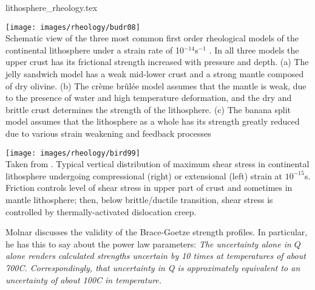 \begin{flushright} {\tiny {\color{gray} lithosphere\_rheology.tex}} \end{flushright}




\begin{center}
\texttt{[image: images/rheology/budr08]}\\
{\captionfont Schematic view of the three most common first order rheological models of the continental 
lithosphere under a strain rate of 10$^{-14}$s$^{-1}$ . 
In all three models the upper crust has its frictional strength increased with pressure and depth. 
(a) The jelly sandwich model has a weak mid-lower crust and a strong mantle composed of dry olivine. 
(b) The cr\`eme br\^ul\'ee model assumes that the mantle is weak, due to the presence of water and high 
temperature deformation, and the dry and brittle crust determines the strength of the lithosphere. 
(c) The banana split model assumes that the lithosphere as a whole has its strength greatly reduced
due to various strain weakening and feedback processes \cite{budr08}}
\end{center}

\begin{center}
\texttt{[image: images/rheology/bird99]}\\
{\captionfont Taken from \cite{bird99}.
Typical vertical distribution of maximum shear stress in continental lithosphere 
undergoing compressional (right) or extensional (left) strain at $10^{-15}$s. 
Friction controls level of shear stress in upper part of crust and sometimes in mantle lithosphere;
then, below brittle/ductile transition, shear stress is controlled by thermally-activated dislocation creep.}
\end{center}

Molnar \cite{moln92} discusses the validity of the Brace-Goetze strength profiles. 
In particular, he has this to say about the power law parameters:
{\it
The uncertainty alone in $Q$ alone renders calculated strengths 
uncertain by 10 times at temperatures of about 700C.
Correspondingly, that uncertainty in Q is approximately equivalent 
to an uncertainty of about 100C in temperature.
}


